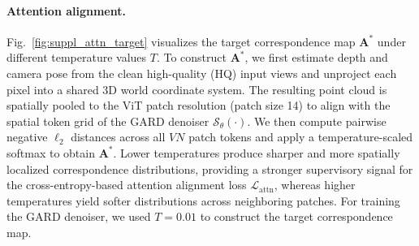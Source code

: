 \paragraph{Attention alignment.}
Fig.~\ref{fig:suppl_attn_target} visualizes the target correspondence map $\mathbf{A}^*$ under different temperature values $T$. To construct $\mathbf{A}^*$, we first estimate depth and camera pose from the clean high-quality (HQ) input views and unproject each pixel into a shared 3D world coordinate system. The resulting point cloud is spatially pooled to the ViT patch resolution (patch size 14) to align with the spatial token grid of the GARD denoiser $\mathcal{S}_{\theta}(\cdot)$. We then compute pairwise negative $\ell_2$ distances across all $VN$ patch tokens and apply a temperature-scaled softmax to obtain $\mathbf{A}^*$. Lower temperatures produce sharper and more spatially localized correspondence distributions, providing a stronger supervisory signal for the cross-entropy-based attention alignment loss $\mathcal{L}_{\text{attn}}$, whereas higher temperatures yield softer distributions across neighboring patches. For training the GARD denoiser, we used $T=0.01$ to construct the target correspondence map.

